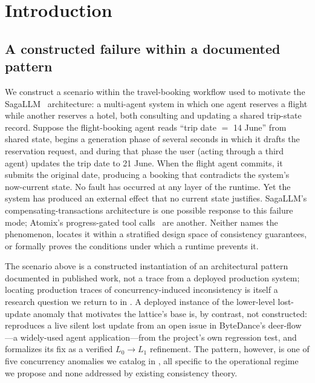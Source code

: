 \documentclass[journal,compsoc,10pt]{IEEEtran}
\providecommand{\citep}{\cite}
\theoremstyle{definition}
\theoremstyle{remark}
\begin{document}
\maketitle
\IEEEdisplaynontitleabstractindextext
\IEEEpeerreviewmaketitle

\section{Introduction}
\label{sec:intro}

\subsection{A constructed failure within a documented pattern}
\label{sec:intro-example}
We construct a scenario within the travel-booking workflow used to
motivate the SagaLLM~\citep{GengChang2025SagaLLM} architecture: a
multi-agent system in which one agent reserves a flight while another
reserves a hotel, both consulting and updating a shared trip-state
record. Suppose the flight-booking agent reads ``trip date $=$ 14
June'' from shared state, begins a generation phase of several seconds
in which it drafts the reservation request, and during that phase the
user (acting through a third agent) updates the trip date to 21 June.
When the flight agent commits, it submits the original date, producing
a booking that contradicts the system's now-current state. No fault
has occurred at any layer of the runtime. Yet the system has produced
an external effect that no current state justifies. SagaLLM's
compensating-transactions architecture is one possible response to
this failure mode; Atomix's progress-gated tool
calls~\citep{MohammadiEtAl2026Atomix} are another. Neither names the
phenomenon, locates it within a stratified design space of consistency
guarantees, or formally proves the conditions under which a runtime
prevents it.

The scenario above is a constructed instantiation of an architectural
pattern documented in published work, not a trace from a deployed
production system; locating production traces of concurrency-induced
inconsistency is itself a research question we return to in
. A deployed instance of the lower-level
lost-update anomaly that motivates the lattice's base is, by contrast,
not constructed:  reproduces a live
silent lost update from an open issue in ByteDance's deer-flow---a
widely-used agent application---from the project's own regression test,
and formalizes its fix as a verified $L_0 \rightarrow L_1$ refinement.
The pattern, however, is one of five concurrency
anomalies we catalog in , all specific to the
operational regime we propose and none addressed by existing
consistency theory.
\end{document}
